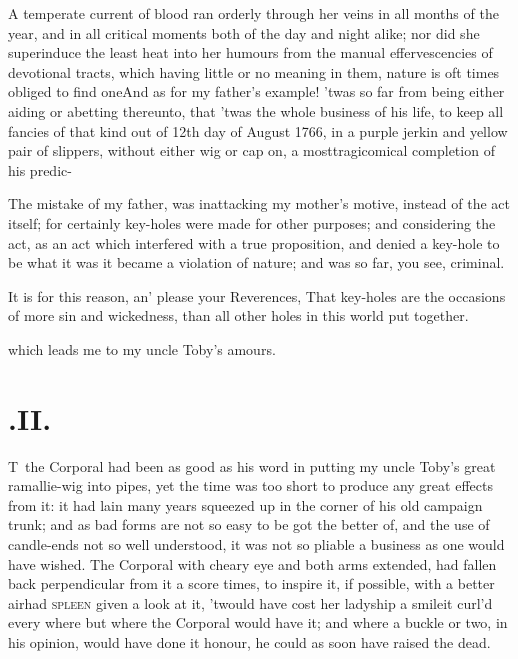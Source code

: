 \documentclass{article}
\begin{document}
A temperate current of blood ran orderly through her veins in
all months of the year, and in all critical moments both\pb 
of the day and night alike; nor did she superinduce the least heat into her humours
from the manual effervescencies of devotional tracts, which having little or no
meaning in them, nature is oft times obliged to find one\tsh And as for my father’s
example!  ’twas so far from being either aiding or abetting thereunto, that ’twas
the whole business of his life, to keep all fancies of that kind out of\break
{}
12th day of
August 1766, in a purple jerkin and yellow pair of slippers, without either
wig or cap on, a most\pb tragicomical completion of his predic-\break
{} 

The mistake of my father, was in\break attacking my mother’s
motive, instead of the act itself; for certainly key-holes were
made for other purposes; and\break 
considering the act, as an act which\break
interfered with a true proposition, and\break
denied a key-hole to be what it was\break
\tsh it became a violation of nature; and was
so far, you see, criminal.

It is for this reason, an’ please your Reverences, That key-holes are\pb
the occasions of more sin and wickedness, than all other holes in this world put
together.

\tsh which leads me to my uncle Toby’s
amours.

\newpage
\null\vspace{-6pt}
\section{.\enspace II.}

\lettrine{T}{\,} the Corporal had been as good
as his word in putting my uncle Toby’s great
ramallie-wig into pipes, yet the time was too short to produce any
great effects from it: it had lain many years squeezed up in the
corner of his old campaign trunk; and as bad forms are not so easy
to be got the better of, and the use of candle-ends not so well
understood, it was not so pliable a business as one would have
wished. The Corporal with cheary eye and both arms extended, had
fallen back perpendicular from it a score times, to inspire it, if
possible, with a better air\tsh had \textsc{spleen}
given a look at it,\pb
’twould have cost her ladyship a
smile\break\tsh it curl’d every where but where the
Corporal would have it; and where a buckle or two, in his opinion,
would have done it honour, he could as soon have raised the
dead.
\end{document}
